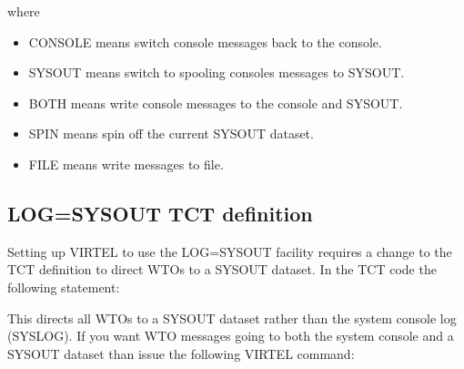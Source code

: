 \documentclass[letterpaper,10pt,english]{sphinxmanual}
\begin{document}
\sphinxAtStartPar
where
\begin{itemize}
\item {} 
\sphinxAtStartPar
CONSOLE means switch console messages back to the console.

\item {} 
\sphinxAtStartPar
SYSOUT means switch to spooling consoles messages to SYSOUT.

\item {} 
\sphinxAtStartPar
BOTH means write console messages to the console and SYSOUT.

\item {} 
\sphinxAtStartPar
SPIN means spin off the current SYSOUT dataset.

\item {} 
\sphinxAtStartPar
FILE means write messages to file.

\end{itemize}


\subsection{LOG=SYSOUT TCT definition}
\label{\detokenize{audit_operations_ and_performance:log-sysout-tct-definition}}
\sphinxAtStartPar
Setting up VIRTEL to use the LOG=SYSOUT facility requires a change to the TCT definition to direct WTOs to a SYSOUT dataset. In the TCT code the following statement:\sphinxhyphen{}

\begin{sphinxVerbatim}[commandchars=\\\{\}]
\PYG{p}{[}\PYG{p}{[}\PYG{p}{]}\PYG{p}{]}

  
\end{sphinxVerbatim}

\newpage

\sphinxAtStartPar
This directs all WTOs to a SYSOUT dataset rather than the system console log (SYSLOG). If you want WTO messages going to both the system console and a SYSOUT dataset than issue the following VIRTEL command:\sphinxhyphen{}

\begin{sphinxVerbatim}[commandchars=\\\{\}]
 
\end{sphinxVerbatim}
\end{document}
